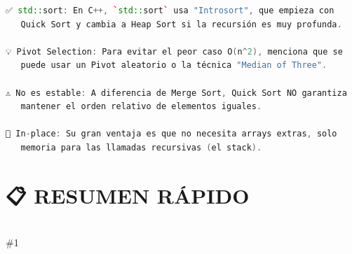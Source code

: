 \documentclass{article}
\newcommand{\resumen}[1]{
    \section*{📋 RESUMEN RÁPIDO}
    \hrulefill \\
    \#1
}
\begin{document}
\begin{lstlisting}[language=C++]
✅ std::sort: En C++, `std::sort` usa "Introsort", que empieza con 
   Quick Sort y cambia a Heap Sort si la recursión es muy profunda.

💡 Pivot Selection: Para evitar el peor caso O(n^2), menciona que se 
   puede usar un Pivot aleatorio o la técnica "Median of Three".

⚠️ No es estable: A diferencia de Merge Sort, Quick Sort NO garantiza
   mantener el orden relativo de elementos iguales.

🔑 In-place: Su gran ventaja es que no necesita arrays extras, solo 
   memoria para las llamadas recursivas (el stack).
\end{lstlisting}

\resumen{
• El más rápido en la práctica.
• Usa la estrategia "Divide y Vencerás".
• In-place (ahorra memoria).
• Peor caso O(n^2) pero muy raro con buen pivot.
• No es estable.
• Operación clave: `partition`.
════════════════════════════════════════════════════════════════
}
\end{document}
